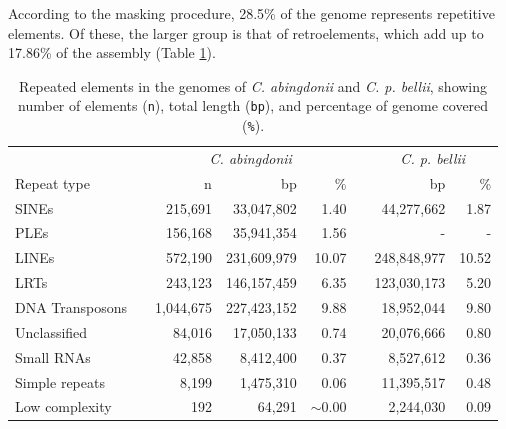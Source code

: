 According to the masking procedure, 28.5\% of the genome represents repetitive elements.
Of these, the larger group is that of retroelements, which add up to 17.86\% of the assembly (Table \ref{t_george_repeatmasker}).

\begin{table}[h]
    \centering
    \caption[Repeated elements in \textit{C. abingdonii}]{\footnotesize Repeated elements in the genomes of \textit{C. abingdonii} and \textit{C. p. bellii}, showing number of elements (\texttt{n}), total length (\texttt{bp}), and percentage of genome covered (\texttt{\%}).}
    \begin{tabular}{lrrrrrrr}
        \hline \hline
        & & \multicolumn{3}{c}{\textit{C. abingdonii}} & & \multicolumn{2}{c}{\textit{C. p. bellii}} \\
        \cline{3-5} \cline{7-8}
        \multicolumn{1}{l}{Repeat type}       & & n         & bp            & \%            & & bp            & \% \\ \hline \hline
        \multicolumn{1}{l}{SINEs}             & & 215,691   & 33,047,802    & 1.40          & & 44,277,662    & 1.87 \\
        \multicolumn{1}{l}{PLEs}              & & 156,168   & 35,941,354    & 1.56          & & -             & - \\
        \multicolumn{1}{l}{LINEs}             & & 572,190   & 231,609,979   & 10.07         & & 248,848,977   & 10.52 \\
        \multicolumn{1}{l}{LRTs}              & & 243,123   & 146,157,459   & 6.35          & & 123,030,173   & 5.20 \\
        \multicolumn{1}{l}{DNA Transposons}   & & 1,044,675 & 227,423,152   & 9.88          & & 18,952,044    & 9.80 \\ 
        \multicolumn{1}{l}{Unclassified}      & & 84,016    & 17,050,133    & 0.74          & & 20,076,666    & 0.80 \\ 
        \multicolumn{1}{l}{Small RNAs}        & & 42,858    & 8,412,400     & 0.37          & & 8,527,612     & 0.36 \\
        \multicolumn{1}{l}{Simple repeats}    & & 8,199     & 1,475,310     & 0.06          & & 11,395,517    & 0.48 \\
        \multicolumn{1}{l}{Low complexity}    & & 192       & 64,291        & $\sim$0.00    & & 2,244,030     & 0.09 \\ \hline \hline
    \end{tabular}
    \label{t_george_repeatmasker}
\end{table}


